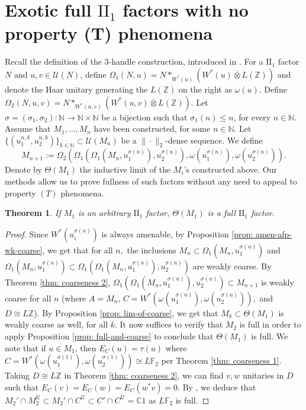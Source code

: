 \documentclass[10pt]{amsart}
\numberwithin{equation}{section}
\newtheorem{thm}{Theorem}[section]
\theoremstyle{definition}
\newcommand{\C}{\mathbb{C}}
\newcommand{\Z}{\mathbb{Z}}
\newcommand{\F}{\mathbb{F}}
\newcommand{\cU}{\mathcal{U}}
\newcommand{\ootimes}{\mathbin{\overline{\otimes}}}
\begin{document}
\section{Exotic full $\mathrm{II}_1$ factors with no property (T) phenomena} \label{sec: exotic factor construction}

Recall the definition of the 3-handle construction, introduced in \cite{gao20253handleconstructionii1factors}. For a $\mathrm{II}_1$ factor $N$ and $u,v\in \mathcal{U}(N)$, define $\Omega_1(N,u)= N*_{W^*(u)}\left(W^*(u)\ootimes L(\mathbb{Z})\right)$  and denote the Haar unitary  generating the $L(\mathbb{Z})$ on the right as $\omega(u)$. Define  $\Omega_2(N,u,v)= N*_{W^*(u,v)}(W^*(u,v)\ootimes 
 L(\mathbb{Z}))$. 
Let $\sigma=(\sigma_1,\sigma_2):\mathbb N\rightarrow\mathbb N\times\mathbb N$ be a bijection such that $\sigma_1(n)\leq n$, for every $n\in\mathbb N$. Assume that $M_1,\ldots,M_n$ have been constructed, for some $n\in\mathbb N$.
Let $\{(u_1^{n,k},u_2^{n,k})\}_{k\in\mathbb N}\subset \mathcal{U}(M_n)$ be a $\|\cdot\|_2$-dense sequence.
We define $$M_{n+1}:=\Omega_2(\Omega_1(\Omega_1(M_n,u_1^{\sigma(n)}),u_2^{\sigma(n)}), \omega(u_1^{\sigma(n)}), \omega(u_2^{\sigma(n)})).$$ Denote by $\Theta(M_1)$ the inductive limit of the $M_i$'s constructed above. Our methods allow us to prove fullness of such factors without any need to appeal to property $(T)$ phenomena. 

\begin{thm}\label{fullness of 3 handle}
    If $M_1$ is an arbitrary $\mathrm{II}_1$ factor, $\Theta(M_1)$ is a full $\mathrm{II}_1$ factor. 
\end{thm}

\begin{proof}
    Since $W^*(u_i^{\sigma(n)})$ is always amenable, by Proposition \ref{prop: amen-afp-wk-coarse}, we get that for all $n,$ the inclusions $M_n\subset \Omega_1(M_n,u_1^{\sigma(n)})$ and $\Omega_1(M_n,u_1^{\sigma(n)}) \subset \Omega_1(\Omega_1(M_n,u_1^{\sigma(n)}),u_2^{\sigma(n)})$ are weakly coarse.
    By Theorem \ref{thm: coarseness 2}, $\Omega_1(\Omega_1(M_n,u_1^{\sigma(n)}),u_2^{\sigma(n)}) \subset M_{n+1}$ is weakly coarse for all $n$ (where $A = M_n$, $C = W^*(\omega(u_1^{\sigma(n)}),\omega(u_2^{\sigma(n)})),$ and $D \cong L\Z$). By Proposition \ref{prop: lim-of-coarse}, we get that $M_k\subset \Theta(M_1)$ is weakly coarse as well, for all $k$. It now suffices to verify that $M_2$ is full in order to apply Proposition \ref{prop: full-and-coarse} to conclude that $\Theta(M_1)$ is full. We note that if $u\in M_1$, then $E_C(u) = \tau(u)$ where $C = W^*(\omega(u_1^{\sigma(1)}),\omega(u_2^{\sigma(1)}))\cong L\F_2$ per Theorem \ref{thm: coarseness 1}. Taking $D \cong L\Z$ in Theorem \ref{thm: coarseness 2}, we can find $v,w$ unitaries in $D$ such that $E_C(v)=E_C(w) = E_C(w^*v) = 0.$ By \cite[Theorem~6.1]{Ioa15}, we deduce that $M_2'\cap M_2^\cU \subset M_2' \cap C^\cU \subset C'\cap C^\cU = \C1$ as $L\F_2$ is full.
\end{proof} 
\end{document}

